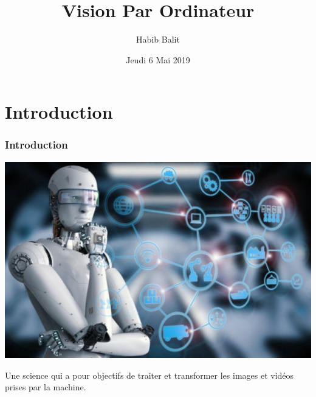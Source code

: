\documentclass[11pt]{beamer}
\author{Habib Balit}
\title{Vision Par Ordinateur}
\institute{Université Paris 8}
\date{Jeudi 6 Mai 2019}
\begin{document}
\begin{frame}
\titlepage
\end{frame}


\begin{frame}
\tableofcontents
\end{frame}

\section{Introduction}
\begin{frame}
\frametitle{Introduction}
\begin{center}
	\includegraphics[scale=0.2]{img2.png}
\end{center}
Une science qui a pour objectifs de traiter et transformer les images et vidéos prises par la machine.
\end{frame}
\end{document}
